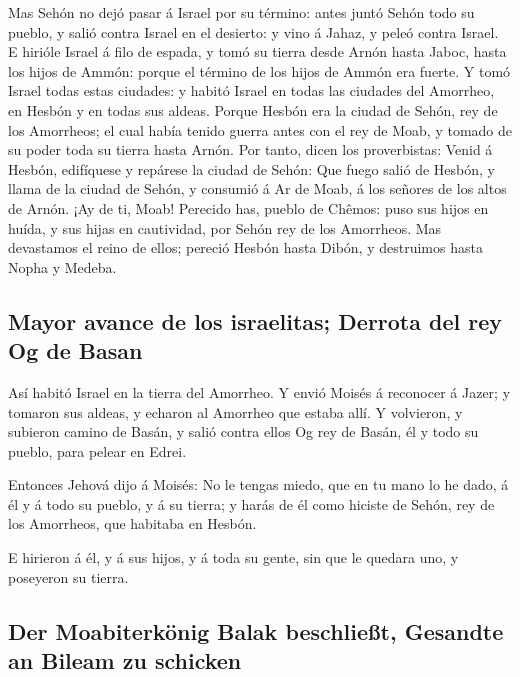  Mas Sehón no dejó pasar á Israel por su término: antes
juntó Sehón todo su pueblo, y salió contra Israel en el desierto: y vino
á Jahaz, y peleó contra Israel.  E hirióle Israel á filo
de espada, y tomó su tierra desde Arnón hasta Jaboc, hasta los hijos de
Ammón: porque el término de los hijos de Ammón era fuerte.
 Y tomó Israel todas estas ciudades: y habitó Israel en
todas las ciudades del Amorrheo, en Hesbón y en todas sus aldeas.
 Porque Hesbón era la ciudad de Sehón, rey de los
Amorrheos; el cual había tenido guerra antes con el rey de Moab, y
tomado de su poder toda su tierra hasta Arnón.  Por
tanto, dicen los proverbistas: Venid á Hesbón, edifíquese y repárese la
ciudad de Sehón:  Que fuego salió de Hesbón, y llama de
la ciudad de Sehón, y consumió á Ar de Moab, á los señores de los altos
de Arnón.  ¡Ay de ti, Moab! Perecido has, pueblo de
Chêmos: puso sus hijos en huída, y sus hijas en cautividad, por Sehón
rey de los Amorrheos.  Mas devastamos el reino de ellos;
pereció Hesbón hasta Dibón, y destruimos hasta Nopha y Medeba.

\hypertarget{mayor-avance-de-los-israelitas-derrota-del-rey-og-de-basan}{%
\subsection{Mayor avance de los israelitas; Derrota del rey Og de
Basan}\label{mayor-avance-de-los-israelitas-derrota-del-rey-og-de-basan}}

 Así habitó Israel en la tierra del Amorrheo.
 Y envió Moisés á reconocer á Jazer; y tomaron sus
aldeas, y echaron al Amorrheo que estaba allí.  Y
volvieron, y subieron camino de Basán, y salió contra ellos Og rey de
Basán, él y todo su pueblo, para pelear en Edrei.

 Entonces Jehová dijo á Moisés: No le tengas miedo, que
en tu mano lo he dado, á él y á todo su pueblo, y á su tierra; y harás
de él como hiciste de Sehón, rey de los Amorrheos, que habitaba en
Hesbón.

 E hirieron á él, y á sus hijos, y á toda su gente, sin
que le quedara uno, y poseyeron su tierra.

\hypertarget{der-moabiterkuxf6nig-balak-beschlieuxdft-gesandte-an-bileam-zu-schicken}{%
\subsection{Der Moabiterkönig Balak beschließt, Gesandte an Bileam zu
schicken}\label{der-moabiterkuxf6nig-balak-beschlieuxdft-gesandte-an-bileam-zu-schicken}}

